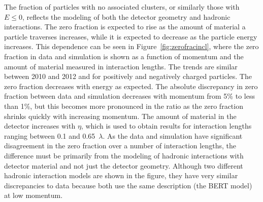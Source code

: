 The fraction of particles with no associated clusters, or similarly those with $E \leq 0$, reflects the modeling of both the detector geometry and hadronic interactions.
The zero fraction is expected to rise as the amount of material a particle traverses increases, while it is expected to decrease as the particle energy increases.
This dependence can be seen in Figure~\ref{fig:zerofracincl}, where the zero fraction in data and simulation is shown as a function of momentum and the amount of material measured in interaction lengths.
The trends are similar between 2010 and 2012 and for positively and negatively charged particles.
The zero fraction decreases with energy as expected.
The absolute discrepancy in zero fraction between data and simulation decreases with momentum from 5\% to less than 1\%, but this becomes more pronounced in the ratio as the zero fraction shrinks quickly with increasing momentum.
The amount of material in the detector increases with $\eta$, which is used to obtain results for interaction lengths ranging between 0.1 and 0.65~$\lambda$.
As the data and simulation have significant disagreement in the zero fraction over a number of interaction lengths, the difference must be primarily from the modeling of hadronic interactions with detector material and not just the detector geometry.
Although two different hadronic interaction models are shown in the figure, they have very similar discrepancies to data because both use the same description (the BERT model) at low momentum.

